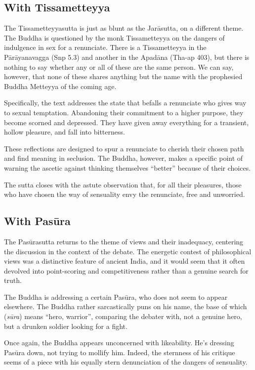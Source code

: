 \documentclass[12pt,openany]{book}%
\begin{document}
\subsection*{With Tissametteyya}

The Tissametteyyasutta is just as blunt as the \textsanskrit{Jarāsutta}, on a different theme. The Buddha is questioned by the monk Tissametteyya on the dangers of indulgence in sex for a renunciate. There is a Tissametteyya in the \textsanskrit{Pārāyanavagga} (Snp 5.3) and another in the \textsanskrit{Apadāna} (Tha-ap 403), but there is nothing to say whether any or all of these are the same person. We can say, however, that none of these shares anything but the name with the prophesied Buddha Metteyya of the coming age.

Specifically, the text addresses the state that befalls a renunciate who gives way to sexual temptation. Abandoning their commitment to a higher purpose, they become scorned and depressed. They have given away everything for a transient, hollow pleasure, and fall into bitterness.

These reflections are designed to spur a renunciate to cherish their chosen path and find meaning in seclusion. The Buddha, however, makes a specific point of warning the ascetic against thinking themselves “better” because of their choices.

The sutta closes with the astute observation that, for all their pleasures, those who have chosen the way of sensuality envy the renunciate, free and unworried.

\subsection*{With \textsanskrit{Pasūra}}

The \textsanskrit{Pasūrasutta} returns to the theme of views and their inadequacy, centering the discussion in the context of the debate. The energetic contest of philosophical views was a distinctive feature of ancient India, and it would seem that it often devolved into point-scoring and competitiveness rather than a genuine search for truth.

The Buddha is addressing a certain \textsanskrit{Pasūra}, who does not seem to appear elsewhere. The Buddha rather sarcastically puns on his name, the base of which (\textit{\textsanskrit{sūra}}) means “hero, warrior”, comparing the debater with, not a genuine hero, but a drunken soldier looking for a fight.

Once again, the Buddha appears unconcerned with likeability. He’s dressing \textsanskrit{Pasūra} down, not trying to mollify him. Indeed, the sternness of his critique seems of a piece with his equally stern denunciation of the dangers of sensuality.
\end{document}

